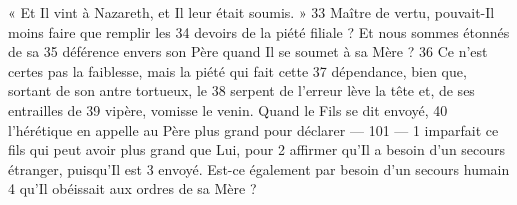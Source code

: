 « Et Il vint à Nazareth, et Il leur était soumis. »	 
33	 	Maître de vertu, pouvait-Il moins faire que remplir les	 
34	 	devoirs de la piété filiale ? Et nous sommes étonnés de sa	 
35	 	déférence envers son Père quand Il se soumet à sa Mère ?	 
36	 	Ce n'est certes pas la faiblesse, mais la piété qui fait cette	 
37	 	dépendance, bien que, sortant de son antre tortueux, le	 
38	 	serpent de l'erreur lève la tête et, de ses entrailles de	 
39	 	vipère, vomisse le venin. Quand le Fils se dit envoyé,	 
40	 	l'hérétique en appelle au Père plus grand pour déclarer	 
 	--- 101 ---	 
1	 	imparfait ce fils qui peut avoir plus grand que Lui, pour	 
2	 	affirmer qu'Il a besoin d'un secours étranger, puisqu'Il est	 
3	 	envoyé. Est-ce également par besoin d'un secours humain	 
4	 	qu'Il obéissait aux ordres de sa Mère ?